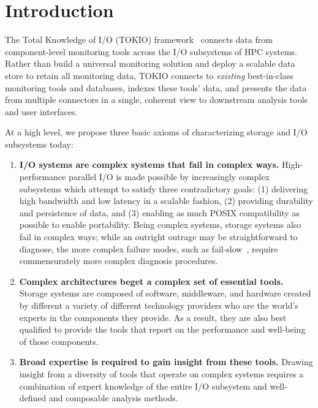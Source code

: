 \section{Introduction}

The Total Knowledge of I/O (TOKIO) framework~\cite{Lockwood2017} connects data from component-level monitoring tools across the I/O subsystems of HPC systems.  Rather than build a universal monitoring solution and deploy a scalable data store to retain all monitoring data, TOKIO connects to \emph{existing} best-in-class monitoring tools and databases, indexes these tools' data, and presents the data from multiple connectors in a single, coherent view to downstream analysis tools and user interfaces.

At a high level, we propose three basic axioms of characterizing storage and I/O subsystems today:

\begin{enumerate}[leftmargin=*]
\item \textbf{I/O systems are complex systems that fail in complex ways.}
High-performance parallel I/O is made possible by increasingly complex subsystems which attempt to satisfy three contradictory goals:
(1) delivering high bandwidth and low latency in a scalable fashion,
(2) providing durability and persistence of data, and
(3) enabling as much POSIX compatibility as possible to enable portability.
Being complex systems, storage systems also fail in complex ways;
while an outright outrage may be straightforward to diagnose, the more complex failure modes, such as fail-slow~\cite{Gunawi2018}, require commensurately more complex diagnosis procedures.

\item \textbf{Complex architectures beget a complex set of essential tools.}
Storage systems are composed of software, middleware, and hardware created by different a variety of different technology providers who are the world's experts in the components they provide.
As a result, they are also best qualified to provide the tools that report on the performance and well-being of those components.

\item \textbf{Broad expertise is required to gain insight from these tools.}
Drawing insight from a diversity of tools that operate on complex systems requires a combination of expert knowledge of the entire I/O subsystem and well-defined and composable analysis methods.
\end{enumerate}

